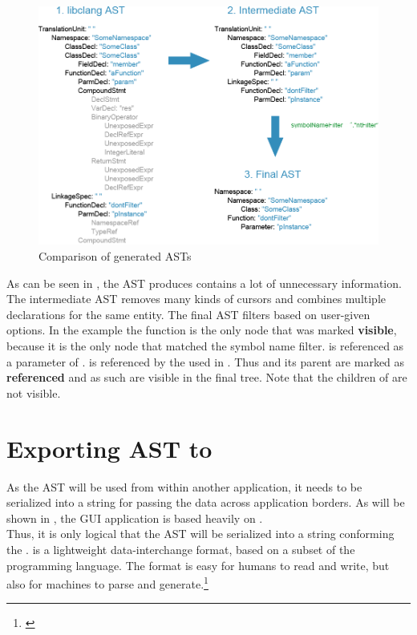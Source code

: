 \vspace{15pt}
\begin{figure}[h] %
	\centering
		\includegraphics[scale=0.45]{Images/TreeExample.png}
	\caption{Comparison of generated ASTs}
	\label{fig:TreeExample}
\end{figure}


As can be seen in , the AST  produces contains a lot of unnecessary information. The intermediate AST removes many kinds of cursors and combines multiple declarations for the same entity. The final AST filters based on user-given options. In the example the function  is the only node that was marked \textbf{visible}, because it is the only node that matched the symbol name filter.  is referenced as a parameter of .  is referenced by the  used in . Thus  and its parent  are marked as \textbf{referenced} and as such are visible in the final tree. Note that the children of  are not visible.

\section{Exporting AST to }
\label{sec:ExportJSON}

As the AST will be used from within another application, it needs to be serialized into a string for passing the data across application borders. As will be shown in , the GUI application is based heavily on .\\
Thus, it is only logical that the AST will be serialized into a string conforming the .   is a lightweight data-interchange format, based on a subset of the  programming language. The format is easy for humans to read and write, but also for machines to parse and generate.\footnote{\citep{JSONHP}}

